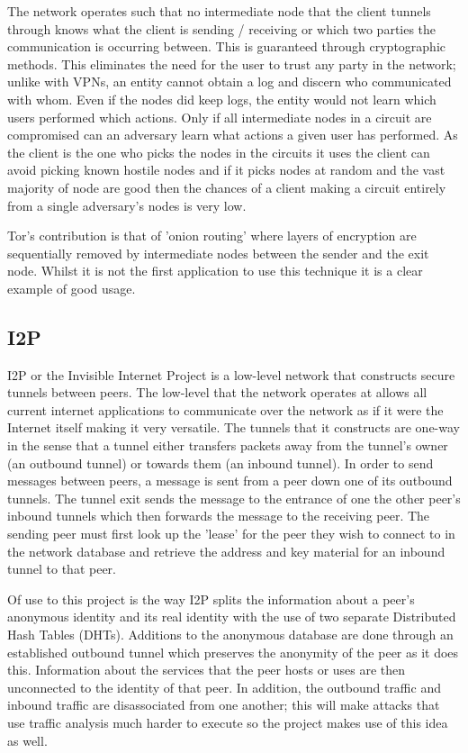 \documentclass[ %
                    author={Luke Murray},
                supervisor={Dr. Simon Hollis},
                     title={Shadow Peer-to-Peer Networks},
                  subtitle={},
                    degree={MEng},
                      year={2013} ]{thesis}
\begin{document}
The network operates such that no intermediate node that the client tunnels through knows what the client is sending / receiving or which two parties the communication is occurring between. This is guaranteed through cryptographic methods. This eliminates the need for the user to trust any party in the network; unlike with VPNs, an entity cannot obtain a log and discern who communicated with whom. Even if the nodes did keep logs, the entity would not learn which users performed which actions. Only if all intermediate nodes in a circuit are compromised can an adversary learn what actions a given user has performed. As the client is the one who picks the nodes in the circuits it uses the client can avoid picking known hostile nodes and if it picks nodes at random and the vast majority of node are good then the chances of a client making a circuit entirely from a single adversary's nodes is very low.

Tor's contribution is that of 'onion routing' where layers of encryption are sequentially removed by intermediate nodes between the sender and the exit node. Whilst it is not the first application to use this technique it is a clear example of good usage.

\subsection{I2P}

I2P\cite{I2P} or the Invisible Internet Project is a low-level network that constructs secure tunnels between peers. The low-level that the network operates at allows all current internet applications to communicate over the network as if it were the Internet itself making it very versatile. The tunnels that it constructs are one-way in the sense that a tunnel either transfers packets away from the tunnel's owner (an outbound tunnel) or towards them (an inbound tunnel). In order to send messages between peers, a message is sent from a peer down one of its outbound tunnels. The tunnel exit sends the message to the entrance of one the other peer's inbound tunnels which then forwards the message to the receiving peer. The sending peer must first look up the 'lease' for the peer they wish to connect to in the network database and retrieve the address and key material for an inbound tunnel to that peer.

Of use to this project is the way I2P splits the information about a peer's anonymous identity and its real identity with the use of two separate Distributed Hash Tables (DHTs). Additions to the anonymous database are done through an established outbound tunnel which preserves the anonymity of the peer as it does this. Information about the services that the peer hosts or uses are then unconnected to the identity of that peer. In addition, the outbound traffic and inbound traffic are disassociated from one another; this will make attacks that use traffic analysis much harder to execute so the project makes use of this idea as well.
\end{document}
